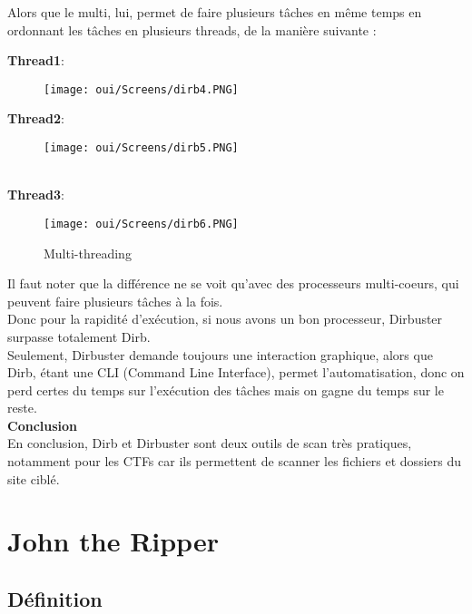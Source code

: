 \newpage
Alors que le multi, lui, permet de faire plusieurs tâches en même temps en ordonnant les tâches en plusieurs threads, de la manière suivante : 
\begin{center}
    \textbf{Thread1}:\\
       \begin{figure}[htp!]
  \centering
  \setlength\figureheight{7cm}
  \setlength\figurewidth{9cm}
  \texttt{[image: oui/Screens/dirb4.PNG]}
  \label{fig:courbe-tikz}
\end{figure}
\textbf{Thread2}:\\
       \begin{figure}[htp!]
  \centering
  \setlength\figureheight{7cm}
  \setlength\figurewidth{9cm}
  \texttt{[image: oui/Screens/dirb5.PNG]}
  \label{fig:courbe-tikz}
\end{figure}\\
\newpage
\textbf{Thread3}:\\
       \begin{figure}[htp!]
  \centering
  \setlength\figureheight{7cm}
  \setlength\figurewidth{9cm}
  \texttt{[image: oui/Screens/dirb6.PNG]}
  \caption{Multi-threading}
  \label{fig:courbe-tikz}
\end{figure}
\end{center}
Il faut noter que la différence ne se voit qu’avec des processeurs multi-coeurs, qui peuvent faire plusieurs tâches à la fois. \\
Donc pour la rapidité d’exécution, si nous avons un bon processeur, Dirbuster surpasse totalement Dirb.\\
Seulement, Dirbuster demande toujours une interaction graphique, alors que Dirb, étant une CLI (Command Line Interface), permet l’automatisation, donc on perd certes du temps sur l’exécution des tâches mais on gagne du temps sur le reste.\\

\noindent \textbf{Conclusion}\\
En conclusion, Dirb et Dirbuster sont deux outils de scan très pratiques, notamment pour les CTFs car ils permettent de scanner les fichiers et dossiers du site ciblé. 

\section{John the Ripper}


\subsection{Définition}

